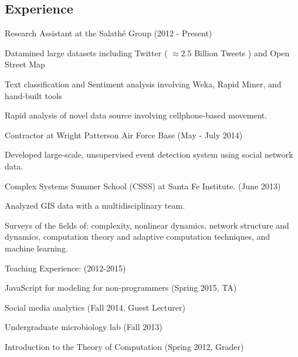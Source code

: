 \documentclass[margin,line]{res}
\newcommand{\linkToUrl}[1]{{\color{blue}\underline{\href{#1}{Link}}}}
\newenvironment{list1}{
  \begin{list}{\ding{113}}{%
      \setlength{\itemsep}{0in}
      \setlength{\parsep}{0in} \setlength{\parskip}{0in}
      \setlength{\topsep}{0in} \setlength{\partopsep}{0in} 
      \setlength{\leftmargin}{0.17in}}}{\end{list}}
\begin{document}
\begin{resume}
\section{\sc  Experience}
Research Assistant at the Salath\'e Group (2012 - Present)
\begin{list1}
\item[] Datamined large datasets including Twitter  ( \(\approx 2.5\) Billion Tweets ) and Open Street Map 
\item[] Text classification and Sentiment analysis involving Weka, Rapid Miner, and hand-built tools
\item[] Rapid analysis of novel data source involving cellphone-based movement. %
\end{list1}

Contractor at Wright Patterson Air Force Base (May - July 2014)
\begin{list1}
\item[] Developed large-scale, unsupervised event detection system using social network data.
\end{list1}

Complex Systems Summer School (CSSS) at Santa Fe Institute. (June 2013)
\begin{list1}
\item[] Analyzed GIS data with a multidisciplinary team.
\item[] Surveys of the fields of: complexity, nonlinear dynamics, network structure and dynamics, computation theory and adaptive computation techniques, and machine learning.
\end{list1}


Teaching Experience: (2012-2015)
\begin{list1}
\item[] JavaScript for modeling for non-programmers (Spring 2015, TA)
\item[] Social media analytics (Fall 2014, Guest Lecturer)
\item[] Undergraduate microbiology lab (Fall 2013)
\item[] Introduction to the Theory of Computation (Spring 2012, Grader)
\end{list1}


\end{resume}
\end{document}
